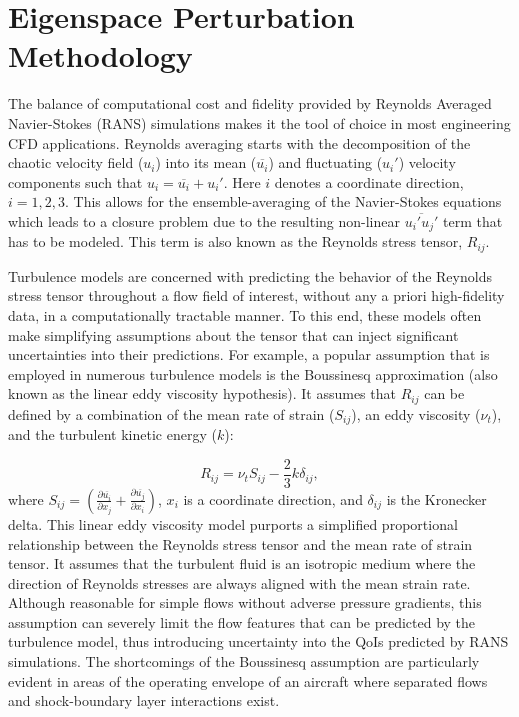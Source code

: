 \section{Eigenspace Perturbation Methodology} \label{sec:equips_rans_uq}

The balance of computational cost and fidelity provided by Reynolds Averaged Navier-Stokes (RANS) simulations makes it the tool of choice in most engineering CFD applications. Reynolds averaging starts with the decomposition of the chaotic velocity field ($ u_i$) into its mean ($\overline{u_i}$) and fluctuating ($u_i'$) velocity components such that $u_i = \overline{u_i} + u_i'$. Here $i$ denotes a coordinate direction, $i=1, 2, 3$. This allows for the ensemble-averaging of the Navier-Stokes equations \cite{pope_2000} which leads to a closure problem due to the resulting non-linear $\overline{u_i'u_j'}$ term that has to be modeled. This term is also known as the Reynolds stress tensor, $R_{ij}$.

Turbulence models are concerned with predicting the behavior of the Reynolds stress tensor throughout a flow field of interest, without any a priori high-fidelity data, in a computationally tractable manner. To this end, these models often make simplifying assumptions about the tensor that can inject significant uncertainties into their predictions. For example, a popular assumption that is employed in numerous turbulence models is the Boussinesq approximation (also known as the linear eddy viscosity hypothesis). It assumes that $R_{ij}$ can be defined by a combination of the mean rate of strain ($S_{ij}$), an eddy viscosity ($\nu_t$), and the turbulent kinetic energy ($k$):
 
 \begin{equation}\label{equ:rst}
     R_{ij} = \nu_t S_{ij} - \frac{2}{3} k \delta_{ij},
 \end{equation}
where $S_{ij} = \left ( \frac{\partial \overline{u_i}}{\partial x_j} + \frac{\partial \overline{u_j}}{\partial x_i} \right )$, $x_i$ is a coordinate direction, and $\delta_{ij}$ is the Kronecker delta. This linear eddy viscosity model purports a simplified proportional relationship between the Reynolds stress tensor and the mean rate of strain tensor. It assumes that the turbulent fluid is an isotropic medium where the direction of Reynolds stresses are always aligned with the mean strain rate. Although reasonable for simple flows without adverse pressure gradients, this assumption can severely limit the flow features that can be predicted by the turbulence model, thus introducing uncertainty into the QoIs predicted by RANS simulations. The shortcomings of the Boussinesq assumption are particularly evident in areas of the operating envelope of an aircraft where separated flows and shock-boundary layer interactions exist. 

